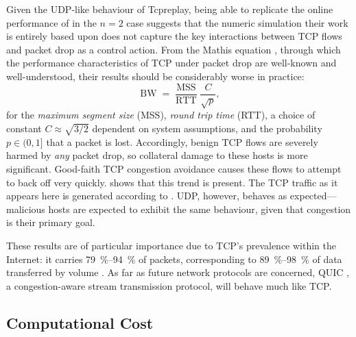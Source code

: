 \documentclass[conference, letterpaper, 10pt, times]{IEEEtran}
\begin{document}
Given the UDP-like behaviour of Tcpreplay, being able to replicate the online performance of \citeauthor{DBLP:journals/eaai/MalialisK15} in the $n=2$ case suggests that the numeric simulation their work is entirely based upon does not capture the key interactions between TCP flows and packet drop as a control action.
From the Mathis equation \cite{DBLP:journals/ccr/MathisSMO97}, through which the performance characteristics of TCP under packet drop are well-known and well-understood, their results should be considerably worse in practice:
\begin{equation}
\operatorname{BW} = \frac{\operatorname{MSS}}{\operatorname{RTT}} \frac{C}{\sqrt{p}},
\end{equation}
for the \emph{maximum segment size} (MSS), \emph{round trip time} (RTT), a choice of constant $C \approx{} \sqrt{3/2}$ dependent on system assumptions, and the probability $p \in (0, 1]$ that a packet is lost.
Accordingly, benign TCP flows are severely harmed by \emph{any} packet drop, so collateral damage to these hosts is more significant.
Good-faith TCP congestion avoidance causes these flows to attempt to back off very quickly.
 shows that this trend is present.
The TCP traffic as it appears here is generated according to .
UDP, however, behaves as expected---malicious hosts are expected to exhibit the same behaviour, given that congestion is their primary goal.

These results are of particular importance due to TCP's prevalence within the Internet: it carries \SIrange{79}{94}{\percent} of packets, corresponding to \SIrange{89}{98}{\percent} of data transferred by volume \cite{DBLP:conf/saint/ZhangDJC09}.
As far as future network protocols are concerned, QUIC \cite{DBLP:conf/sigcomm/LangleyRWVKZYKS17}, a congestion-aware stream transmission protocol, will behave much like TCP.

\subsection{Computational Cost}
\end{document}
